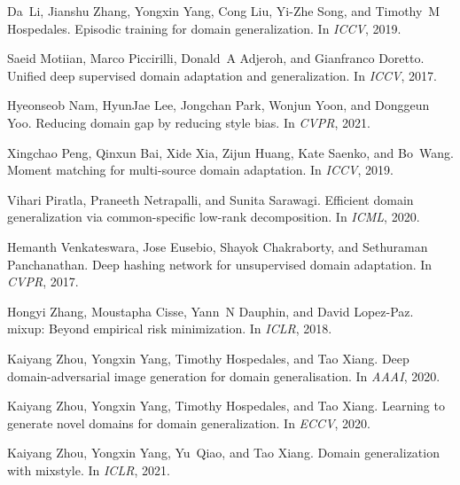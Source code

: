 \documentclass{article}
\begin{document}
\begin{thebibliography}{}
Da~Li, Jianshu Zhang, Yongxin Yang, Cong Liu, Yi-Zhe Song, and Timothy~M
  Hospedales.
\newblock Episodic training for domain generalization.
\newblock In {\em ICCV}, 2019.

Saeid Motiian, Marco Piccirilli, Donald~A Adjeroh, and Gianfranco Doretto.
\newblock Unified deep supervised domain adaptation and generalization.
\newblock In {\em ICCV}, 2017.

Hyeonseob Nam, HyunJae Lee, Jongchan Park, Wonjun Yoon, and Donggeun Yoo.
\newblock Reducing domain gap by reducing style bias.
\newblock In {\em CVPR}, 2021.

Xingchao Peng, Qinxun Bai, Xide Xia, Zijun Huang, Kate Saenko, and Bo~Wang.
\newblock Moment matching for multi-source domain adaptation.
\newblock In {\em ICCV}, 2019.

Vihari Piratla, Praneeth Netrapalli, and Sunita Sarawagi.
\newblock Efficient domain generalization via common-specific low-rank
  decomposition.
\newblock In {\em ICML}, 2020.

Hemanth Venkateswara, Jose Eusebio, Shayok Chakraborty, and Sethuraman
  Panchanathan.
\newblock Deep hashing network for unsupervised domain adaptation.
\newblock In {\em CVPR}, 2017.

Hongyi Zhang, Moustapha Cisse, Yann~N Dauphin, and David Lopez-Paz.
\newblock mixup: Beyond empirical risk minimization.
\newblock In {\em ICLR}, 2018.

Kaiyang Zhou, Yongxin Yang, Timothy Hospedales, and Tao Xiang.
\newblock Deep domain-adversarial image generation for domain generalisation.
\newblock In {\em AAAI}, 2020.

Kaiyang Zhou, Yongxin Yang, Timothy Hospedales, and Tao Xiang.
\newblock Learning to generate novel domains for domain generalization.
\newblock In {\em ECCV}, 2020.

Kaiyang Zhou, Yongxin Yang, Yu~Qiao, and Tao Xiang.
\newblock Domain generalization with mixstyle.
\newblock In {\em ICLR}, 2021.

\end{thebibliography}
 
\end{document}
